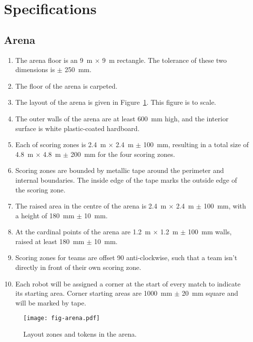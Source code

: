 \section{Specifications}
\label{sec:specs}

\subsection{Arena}
\label{spec:arena}

\begin{enumerate}
  \item The arena floor is an \SI{9}{m} $\times$ \SI{9}{m} rectangle. The
        tolerance of these two dimensions is $\pm$ \SI{250}{mm}.
  \item The floor of the arena is carpeted.
  \item The layout of the arena is given in Figure~\ref{fig:arena}. This
        figure is to scale.
  \item The outer walls of the arena are at least \SI{600}{mm} high, and the
        interior surface is white plastic-coated hardboard.
  \item Each of scoring zones is \SI{2.4}{m} $\times$ \SI{2.4}{m} $\pm$ \SI{100}{mm},
        resulting in a total size of \SI{4.8}{m} $\times$ \SI{4.8}{m} $\pm$ \SI{200}{mm}
        for the four scoring zones.
  \item Scoring zones are bounded by metallic tape around the perimeter
        and internal boundaries. The inside edge of the tape marks the outside
        edge of the scoring zone.
  \item The raised area in the centre of the arena is \SI{2.4}{m} $\times$ \SI{2.4}{m} $\pm$ \SI{100}{mm},
        with a height of \SI{180}{mm} $\pm$ \SI{10}{mm}.
  \item At the cardinal points of the arena are \SI{1.2}{m} $\times$ \SI{1.2}{m} $\pm$ \SI{100}{mm} walls,
        raised at least \SI{180}{mm} $\pm$ \SI{10}{mm}.
  \item Scoring zones for teams are offset 90\degree{} anti-clockwise, such
        that a team isn't directly in front of their own scoring zone.
  \item Each robot will be assigned a corner at the start of every match to indicate its starting area.
        Corner starting areas are \SI{1000}{mm} $\pm$ \SI{20}{mm} square and will be marked by tape.
\end{enumerate}

\begin{figure}
  \texttt{[image: fig-arena.pdf]}
  \caption{Layout zones and tokens in the arena.}
  \label{fig:arena}
\end{figure}

